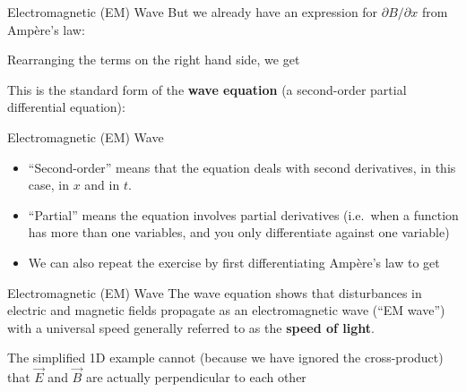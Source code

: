 \documentclass[12pt,aspectratio=169]{beamer}
\begin{document}
\begin{frame}{Electromagnetic (EM) Wave}
  But we already have an expression for $\partial B/\partial x$ from
  Amp\`{e}re's law:


  Rearranging the terms on the right hand side, we get

  
  This is the standard form of the \textbf{wave equation} (a second-order
  partial differential equation):

\end{frame}



\begin{frame}{Electromagnetic (EM) Wave}
  \begin{itemize}
  \item ``Second-order'' means that the equation deals with second derivatives,
    in this case, in $x$ and in $t$.
  \item ``Partial'' means the equation involves partial derivatives (i.e.\
    when a function has more than one variables, and you only differentiate
    against one variable)
  \item We can also repeat the exercise by first differentiating Amp\`{e}re's
    law to get

  \end{itemize}
\end{frame}



\begin{frame}{Electromagnetic (EM) Wave}
  The wave equation shows that disturbances in electric and magnetic fields
  propagate as an electromagnetic wave (``EM wave'') with a universal speed
  generally referred to as the \textbf{speed of light}.

  \eq{-.1in}{
    v=c_0=\frac1{\sqrt{\mu_0\epsilon_0}}=\SI{299792458}{\metre\per\second}
  }

  The simplified 1D example cannot (because we have ignored the cross-product)
  that $\vec E$ and $\vec B$ are actually perpendicular to each other
\end{frame}
\end{document}
